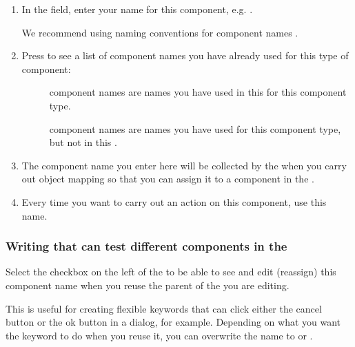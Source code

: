 \begin{enumerate}
\item In the  field, enter your name for this component, e.g. . 

We recommend using naming conventions for component names . 

\item Press  to see a list of component names you have already used for this type of component:

\begin{description}
\item[]{ component names are names you have used in this \gdcase{} for this component type. }
\item []{ component names are names you have used for this component type, but not in this \gdcase{}. }
 \end{description}

\item The component name you enter here will be collected by the \gdomeditor{} when you carry out object mapping so that you can assign it to a component in the \gdaut{}. 

\item Every time you want to carry out an action on this component, use this name. 
\end{enumerate}

\subsubsection{Writing \gdcases{} that can test different components in the \gdaut{}}
\label{TasksCompNamesCheckbox}
Select the checkbox on the left of the \gdcompnamesview{} to be able to see and edit (reassign) this component name when you reuse the parent of the \gdcase{} you are editing. 

This is useful for creating flexible keywords that can click either the cancel button or the ok button in a dialog, for example. Depending on what you want the keyword to do when you reuse it, you can overwrite the name to  or . 

